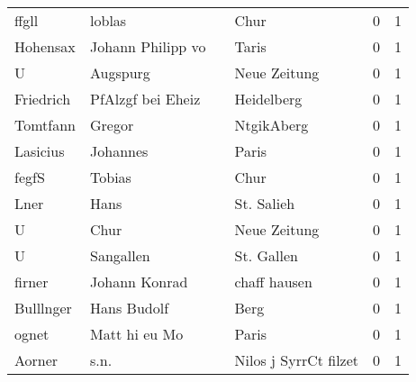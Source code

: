 \begin{tabular}{llllrr}
                    ffgll &                             loblas &             &                                        Chur &          0 &         1 \\
                 Hohensax &                  Johann Philipp vo &             &                                       Taris &          0 &         1 \\
                        U &                           Augspurg &             &                                Neue Zeitung &          0 &         1 \\
                Friedrich &                  PfAlzgf bei Eheiz &             &                                  Heidelberg &          0 &         1 \\
                 Tomtfann &                             Gregor &             &                                  NtgikAberg &          0 &         1 \\
                 Lasicius &                           Johannes &             &                                       Paris &          0 &         1 \\
                    fegfS &                             Tobias &             &                                        Chur &          0 &         1 \\
                     Lner &                               Hans &             &                                  St. Salieh &          0 &         1 \\
                        U &                               Chur &             &                                Neue Zeitung &          0 &         1 \\
                        U &                          Sangallen &             &                                  St. Gallen &          0 &         1 \\
                   firner &                      Johann Konrad &             &                                chaff hausen &          0 &         1 \\
                Bulllnger &                        Hans Budolf &             &                                        Berg &          0 &         1 \\
                    ognet &                      Matt hi eu Mo &             &                                       Paris &          0 &         1 \\
                   Aorner &                               s.n. &             &                       Nilos j SyrrCt filzet &          0 &         1 \\

\end{tabular}
